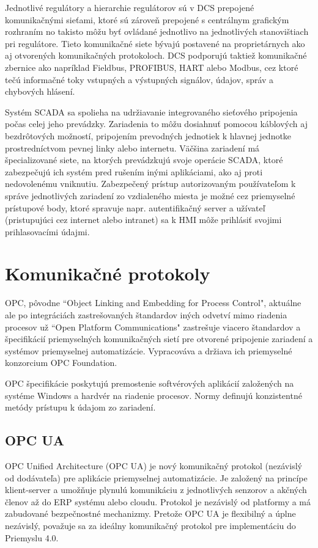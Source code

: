 \documentclass[]{tukediphc}
\begin{document}
Jednotlivé  regulátory a hierarchie regulátorov sú v DCS prepojené komunikačnými sieťami, ktoré sú zároveň prepojené s centrálnym grafickým rozhraním no takisto môžu byť ovládané jednotlivo na jednotlivých stanovištiach pri regulátore. Tieto komunikačné siete bývajú postavené na proprietárnych ako aj otvorených komunikačných protokoloch. DCS podporujú taktiež komunikačné zbernice ako napríklad Fieldbus, PROFIBUS, HART alebo Modbus, cez ktoré tečú informačné toky vstupných a výstupných signálov, údajov, správ a chybových hlásení.

Systém SCADA sa spolieha na udržiavanie integrovaného sieťového pripojenia počas celej jeho prevádzky. Zariadenia to môžu dosiahnuť pomocou káblových aj bezdrôtových možností, pripojením prevodných jednotiek k hlavnej jednotke prostredníctvom pevnej linky alebo internetu. Väčšina zariadení má špecializované siete, na ktorých prevádzkujú svoje operácie SCADA, ktoré zabezpečujú ich systém pred rušením inými aplikáciami, ako aj proti nedovolenému vniknutiu. Zabezpečený prístup autorizovaným používateľom k správe jednotlivých zariadení zo vzdialeného miesta je možné cez priemyselné prístupové body, ktoré spravuje napr. autentifikačný server a užívateľ (pristupujúci cez internet alebo intranet) sa k HMI môže prihlásiť svojimi prihlasovacími údajmi.

\section{Komunikačné protokoly}

OPC, pôvodne ``Object Linking and Embedding for Process Control", aktuálne ale po integráciách zastrešovaných štandardov iných odvetví mimo riadenia procesov už ``Open Platform Communications" zastrešuje viacero štandardov a špecifikácií priemyselných komunikačných sietí pre otvorené pripojenie zariadení a systémov priemyselnej automatizácie. Vypracováva a držiava ich priemyselné konzorcium OPC Foundation.

OPC špecifikácie poskytujú premostenie softvérových aplikácií založených na systéme Windows a hardvér na riadenie procesov. Normy definujú konzistentné metódy prístupu k údajom zo zariadení.

\subsection{OPC UA}

OPC Unified Architecture (OPC UA) je nový komunikačný protokol (nezávislý od dodávateľa) pre aplikácie priemyselnej automatizácie. Je založený na princípe klient-server a umožňuje plynulú komunikáciu z jednotlivých senzorov a akčných členov až do ERP systému alebo cloudu. Protokol je nezávislý od platformy a má zabudované bezpečnostné mechanizmy. Pretože OPC UA je flexibilný a úplne nezávislý, považuje sa za ideálny komunikačný protokol pre implementáciu do Priemyslu 4.0.
\end{document}
